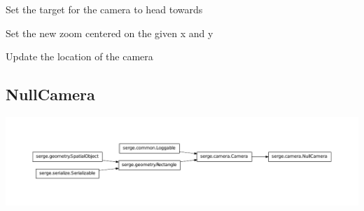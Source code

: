 \documentclass[letterpaper,10pt,english]{sphinxmanual}
\begin{document}
\begin{fulllineitems}

\begin{fulllineitems}
\label{renderering:serge.camera.Camera.setTarget}
Set the target for the camera to head towards

\end{fulllineitems}


\begin{fulllineitems}
\label{renderering:serge.camera.Camera.setZoom}
Set the new zoom centered on the given x and y

\end{fulllineitems}


\begin{fulllineitems}
\label{renderering:serge.camera.Camera.update}
Update the location of the camera

\end{fulllineitems}


\end{fulllineitems}



\subsection{NullCamera}
\label{renderering:nullcamera}
\includegraphics{inheritance-fd4136fac104860ff8c6f5c7355c3df1b33cd442.pdf}
\end{document}
